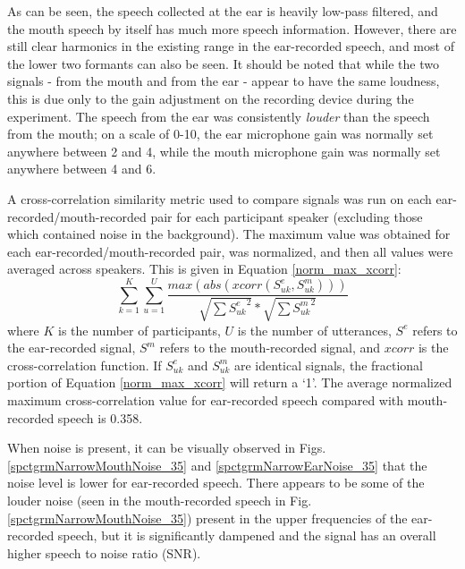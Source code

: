 As can be seen, the speech collected at the ear is heavily low-pass filtered, and the mouth speech by itself has much more speech information. However, there are still clear harmonics in the existing range in the ear-recorded speech, and most of the lower two formants can also be seen.  It should be noted that while the two signals - from the mouth and from the ear - appear to have the same loudness, this is due only to the gain adjustment on the recording device during the experiment.  The speech from the ear was consistently \textit{louder} than the speech from the mouth; on a scale of 0-10, the ear microphone gain was normally set anywhere between 2 and 4, while the mouth microphone gain was normally set anywhere between 4 and 6.


A cross-correlation similarity metric used to compare signals was run on each ear-recorded/mouth-recorded pair for each participant speaker (excluding those which contained noise in the background).  The maximum value was obtained for each ear-recorded/mouth-recorded pair, was normalized, and then all values were averaged across speakers.  This is given in Equation \ref{norm_max_xcorr}:
%
\begin{equation}\label{norm_max_xcorr}
\sum_{k=1}^{K} \sum_{u=1}^{U} \dfrac{max(abs(xcorr(S^e_{uk}, S^m_{uk})))}{\sqrt{\sum {S^e_{uk}}^2}*\sqrt{\sum {S^m_{uk}}^2}}
\end{equation}
%
where $K$ is the number of participants, $U$ is the number of utterances, $S^e$ refers to the ear-recorded signal, $S^m$ refers to the mouth-recorded signal, and $xcorr$ is the cross-correlation function. If $S^e_{uk}$ and $S^m_{uk}$ are identical signals, the fractional portion of Equation \ref{norm_max_xcorr} will return a `1'.  The average normalized maximum cross-correlation value for ear-recorded speech compared with mouth-recorded speech is 0.358.

When noise is present, it can be visually observed in Figs. \ref{spctgrmNarrowMouthNoise_35} and \ref{spctgrmNarrowEarNoise_35} that the noise level is lower for ear-recorded speech.  There appears to be some of the louder noise (seen in the mouth-recorded speech in Fig. \ref{spctgrmNarrowMouthNoise_35}) present in the upper frequencies of the ear-recorded speech, but it is significantly dampened and the signal has an overall higher speech to noise ratio (SNR).

